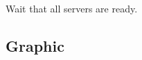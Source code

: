\documentclass[letterpaper,10pt,english]{sphinxmanual}
\begin{document}
\begin{fulllineitems}
\begin{fulllineitems}
\end{fulllineitems}


\begin{fulllineitems}
\label{api:game.GameManagement.wait_servers}
Wait that all servers are ready.

\end{fulllineitems}


\end{fulllineitems}



\subsection{Graphic}
\label{api:graphic}
\end{document}

